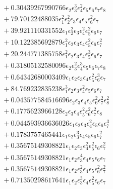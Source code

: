\documentclass[10pt]{article}
\begin{document}
\begin{align*}
&{}  + 0.30439267990766 \epsilon_{2} \epsilon_{3}^{3} \epsilon_{4}^{2} \epsilon_{5} \epsilon_{6} \epsilon_{7} \epsilon_{8} \\
&{}  + 79.70122488035 \epsilon_{1}^{2} \epsilon_{2}^{2} \epsilon_{3} \epsilon_{4} \epsilon_{5} \epsilon_{6}^{2} \epsilon_{7} \\
&{}  + 39.921110331552 \epsilon_{1} \epsilon_{2}^{2} \epsilon_{3} \epsilon_{4}^{2} \epsilon_{5}^{2} \epsilon_{6} \epsilon_{7} \\
&{}  + 10.122385692879 \epsilon_{1}^{2} \epsilon_{2} \epsilon_{3} \epsilon_{4} \epsilon_{5}^{2} \epsilon_{6} \epsilon_{7}^{2} \\
&{}  + 20.244771385758 \epsilon_{1}^{2} \epsilon_{2} \epsilon_{3} \epsilon_{4} \epsilon_{5}^{3} \epsilon_{6} \epsilon_{7} \\
&{}  + 0.31805132580096 \epsilon_{2} \epsilon_{3}^{2} \epsilon_{4}^{3} \epsilon_{5} \epsilon_{6} \epsilon_{7} \epsilon_{8} \\
&{}  + 0.64342680003409 \epsilon_{1} \epsilon_{2} \epsilon_{3} \epsilon_{4} \epsilon_{5}^{2} \epsilon_{6}^{3} \epsilon_{7} \\
&{}  + 84.769232835238 \epsilon_{1}^{3} \epsilon_{2} \epsilon_{3} \epsilon_{4}^{2} \epsilon_{5} \epsilon_{6} \epsilon_{7} \\
&{}  + 0.043577584516696 \epsilon_{2} \epsilon_{3} \epsilon_{4} \epsilon_{5} \epsilon_{6}^{2} \epsilon_{7}^{2} \epsilon_{8}^{2} \\
&{}  + 0.1775623966128 \epsilon_{2} \epsilon_{3} \epsilon_{4} \epsilon_{5}^{2} \epsilon_{6}^{2} \epsilon_{7}^{2} \epsilon_{8} \\
&{}  + 0.044593936636026 \epsilon_{1} \epsilon_{2} \epsilon_{3} \epsilon_{4}^{2} \epsilon_{5} \epsilon_{6} \epsilon_{7}^{3} \\
&{}  + 0.1783757465441 \epsilon_{1} \epsilon_{2} \epsilon_{3}^{3} \epsilon_{4} \epsilon_{5} \epsilon_{6} \epsilon_{7}^{2} \\
&{}  + 0.35675149308821 \epsilon_{1} \epsilon_{2} \epsilon_{3} \epsilon_{4}^{2} \epsilon_{5}^{2} \epsilon_{6} \epsilon_{7}^{2} \\
&{}  + 0.35675149308821 \epsilon_{1} \epsilon_{2} \epsilon_{3}^{4} \epsilon_{4} \epsilon_{5} \epsilon_{6} \epsilon_{7} \\
&{}  + 0.35675149308821 \epsilon_{1} \epsilon_{2} \epsilon_{3}^{2} \epsilon_{4} \epsilon_{5} \epsilon_{6}^{2} \epsilon_{7}^{2} \\
&{}  + 0.71350298617641 \epsilon_{1} \epsilon_{2} \epsilon_{3}^{3} \epsilon_{4} \epsilon_{5}^{2} \epsilon_{6} \epsilon_{7} \\

\end{align*}
\end{document}
